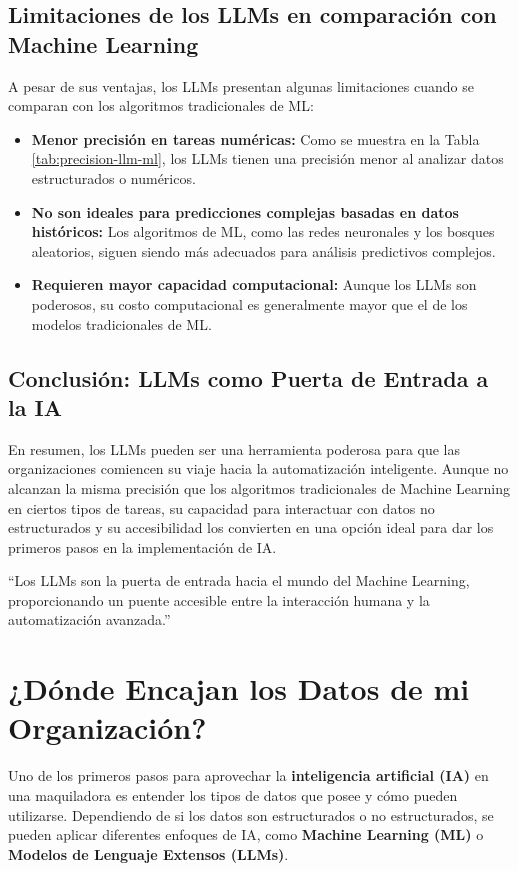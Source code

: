 \subsection{Limitaciones de los LLMs en comparación con Machine Learning}
A pesar de sus ventajas, los LLMs presentan algunas limitaciones cuando se comparan con los algoritmos tradicionales de ML:
\begin{itemize}
    \item \textbf{Menor precisión en tareas numéricas:} Como se muestra en la Tabla \ref{tab:precision-llm-ml}, los LLMs tienen una precisión menor al analizar datos estructurados o numéricos.
    \item \textbf{No son ideales para predicciones complejas basadas en datos históricos:} Los algoritmos de ML, como las redes neuronales y los bosques aleatorios, siguen siendo más adecuados para análisis predictivos complejos.
    \item \textbf{Requieren mayor capacidad computacional:} Aunque los LLMs son poderosos, su costo computacional es generalmente mayor que el de los modelos tradicionales de ML.
\end{itemize}

\subsection{Conclusión: LLMs como Puerta de Entrada a la IA}
En resumen, los LLMs pueden ser una herramienta poderosa para que las organizaciones comiencen su viaje hacia la automatización inteligente. Aunque no alcanzan la misma precisión que los algoritmos tradicionales de Machine Learning en ciertos tipos de tareas, su capacidad para interactuar con datos no estructurados y su accesibilidad los convierten en una opción ideal para dar los primeros pasos en la implementación de IA.

``Los LLMs son la puerta de entrada hacia el mundo del Machine Learning, proporcionando un puente accesible entre la interacción humana y la automatización avanzada.''

\section{¿Dónde Encajan los Datos de mi Organización?}\label{donde-encajan-los-datos}

Uno de los primeros pasos para aprovechar la \textbf{inteligencia artificial (IA)} en una maquiladora es entender los tipos de datos que posee y cómo pueden utilizarse. Dependiendo de si los datos son estructurados o no estructurados, se pueden aplicar diferentes enfoques de IA, como \textbf{Machine Learning (ML)} o \textbf{Modelos de Lenguaje Extensos (LLMs)}.

